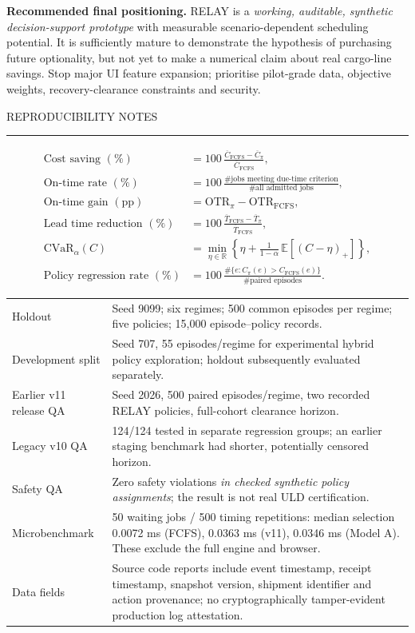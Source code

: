 \documentclass[10pt,a4paper]{article}
\newcommand{\sect}[2]{\vspace{4mm}{\Large\sffamily\bfseries #1}\hfill{\small\sffamily\color{muted}#2}\par\vspace{1mm}\color{sage}\rule{\linewidth}{1.0pt}\color{ink}\vspace{2mm}}
\newcommand{\subsect}[1]{\vspace{3mm}{\large\sffamily\bfseries #1}\par\vspace{1mm}}
\begin{document}
\begin{insight}
\textbf{Recommended final positioning.} RELAY is a \emph{working, auditable, synthetic decision-support prototype} with measurable scenario-dependent scheduling potential. It is sufficiently mature to demonstrate the hypothesis of purchasing future optionality, but not yet to make a numerical claim about real cargo-line savings. Stop major UI feature expansion; prioritise pilot-grade data, objective weights, recovery-clearance constraints and security.
\end{insight}
\newpage

\sect{14 / Definitions, method and evidence}{REPRODUCIBILITY NOTES}
\subsect{Metric definitions}
\begin{align*}
\text{Cost saving }(\%) &=100\,\frac{\overline C_{\mathrm{FCFS}}-\overline C_{\pi}}{\overline C_{\mathrm{FCFS}}},\\[2pt]
\text{On-time rate }(\%)&=100\,\frac{\#\text{jobs meeting due-time criterion}}{\#\text{all admitted jobs}},\\[2pt]
\text{On-time gain }(\mathrm{pp})&=\mathrm{OTR}_{\pi}-\mathrm{OTR}_{\mathrm{FCFS}},\\[2pt]
\text{Lead time reduction }(\%)&=100\,\frac{\overline T_{\mathrm{FCFS}}-\overline T_{\pi}}{\overline T_{\mathrm{FCFS}}},\\[2pt]
\mathrm{CVaR}_{\alpha}(C)&=\min_{\eta\in\mathbb R}\left\{\eta+\frac{1}{1-\alpha}\,\mathbb E[(C-\eta)_+]\right\},\\[2pt]
\text{Policy regression rate }(\%)&=100\,\frac{\#\{e:C_\pi(e)>C_{\mathrm{FCFS}}(e)\}}{\#\text{paired episodes}}.
\end{align*}
\subsect{Test configurations and QA provenance}
\begin{tabularx}{\linewidth}{@{}p{38mm}X@{}}
\toprule
Holdout & Seed 9099; six regimes; 500 common episodes per regime; five policies; 15,000 episode--policy records.\\
Development split & Seed 707, 55 episodes/regime for experimental hybrid policy exploration; holdout subsequently evaluated separately.\\
Earlier v11 release QA & Seed 2026, 500 paired episodes/regime, two recorded RELAY policies, full-cohort clearance horizon.\\
Legacy v10 QA & 124/124 tested in separate regression groups; an earlier staging benchmark had shorter, potentially censored horizon.\\
Safety QA & Zero safety violations \emph{in checked synthetic policy assignments}; the result is not real ULD certification.\\
Microbenchmark & 50 waiting jobs / 500 timing repetitions: median selection 0.0072 ms (FCFS), 0.0363 ms (v11), 0.0346 ms (Model A). These exclude the full engine and browser.\\
Data fields & Source code reports include event timestamp, receipt timestamp, snapshot version, shipment identifier and action provenance; no cryptographically tamper-evident production log attestation.\\
\bottomrule
\end{tabularx}
\end{document}
